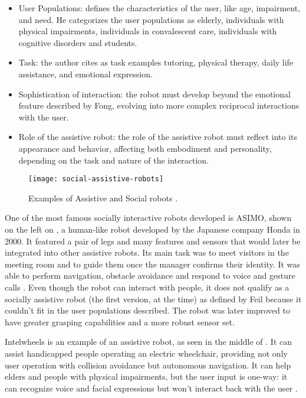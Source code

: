 \begin{itemize}
    \item User Populations: defines the characteristics of the user, like age, impairment, and need. He categorizes the user populations as elderly, individuals with physical impairments, individuals in convalescent care, individuals with cognitive disorders and students.
    \item Task: the author cites as task examples tutoring, physical therapy, daily life assistance, and emotional expression.
    \item Sophistication of interaction: the robot must develop beyond the emotional feature described by Fong, evolving into more complex reciprocal interactions with the user.
    \item Role of the assistive robot: the role of the assistive robot must reflect into its appearance and behavior, affecting both embodiment and personality, depending on the task and nature of the interaction.
\end{itemize}

\begin{figure}[!ht]
    \centering
    \texttt{[image: social-assistive-robots]}
    \caption{Examples of Assistive and Social robots \cite{sakagami2002intelligent,braga2008intellwheels,tanaka2015pepper}.}
    \label{fig:social-assistive-robots}
\end{figure}

One of the most famous socially interactive robots developed is ASIMO, shown on the left on , a human-like robot developed by the Japanese company Honda in 2000. It featured a pair of legs and many features and sensors that would later be integrated into other assistive robots. Its main task was to meet visitors in the meeting room and to guide them once the manager confirms their identity. It was able to perform navigation, obstacle avoidance and respond to voice and gesture calls \cite{sakagami2002intelligent}. Even though the robot can interact with people, it does not qualify as a socially assistive robot (the first version, at the time) as defined by Feil because it couldn't fit in the user populations described. The robot was later improved to have greater grasping capabilities and a more robust sensor set.

Intelwheels is an example of an assistive robot, as seen in the middle of . It can assist handicapped people operating an electric wheelchair, providing not only user operation with collision avoidance but autonomous navigation. It can help elders and people with physical impairments, but the user input is one-way: it can recognize voice and facial expressions but won't interact back with the user \cite{braga2008intellwheels}.

